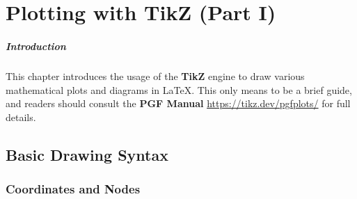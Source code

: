 \chapter{Plotting with TikZ (Part I)}

\paragraph{Introduction} This chapter introduces the usage of the \textbf{TikZ} engine to draw various mathematical plots and diagrams in \LaTeX{}. This only means to be a brief guide, and readers should consult the \textbf{PGF Manual} \href{https://tikz.dev/pgfplots/}{https://tikz.dev/pgfplots/} for full details.

\section{Basic Drawing Syntax}

\subsection{Coordinates and Nodes} 

